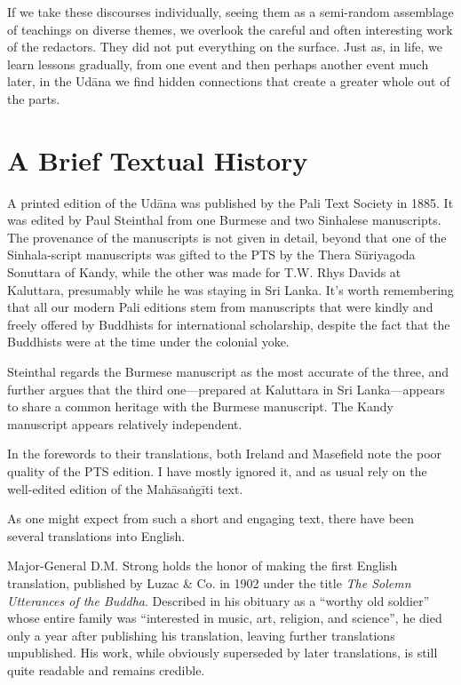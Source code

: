 \documentclass[12pt,openany]{book}%
\begin{document}
If we take these discourses individually, seeing them as a semi-random assemblage of teachings on diverse themes, we overlook the careful and often interesting work of the redactors. They did not put everything on the surface. Just as, in life, we learn lessons gradually, from one event and then perhaps another event much later, in the \textsanskrit{Udāna} we find hidden connections that create a greater whole out of the parts.

\section*{A Brief Textual History}

A printed edition of the \textsanskrit{Udāna} was published by the Pali Text Society in 1885. It was edited by Paul Steinthal from one Burmese and two Sinhalese manuscripts. The provenance of the manuscripts is not given in detail, beyond that one of the Sinhala-script manuscripts was gifted to the PTS by the Thera \textsanskrit{Sūriyagoda} Sonuttara of Kandy, while the other was made for T.W. Rhys Davids at Kaluttara, presumably while he was staying in Sri Lanka. It’s worth remembering that all our modern Pali editions stem from manuscripts that were kindly and freely offered by Buddhists for international scholarship, despite the fact that the Buddhists were at the time under the colonial yoke. 

Steinthal regards the Burmese manuscript as the most accurate of the three, and further argues that the third one—prepared at Kaluttara in Sri Lanka—appears to share a common heritage with the Burmese manuscript. The Kandy manuscript appears relatively independent.

In the forewords to their translations, both Ireland and Masefield note the poor quality of the PTS edition. I have mostly ignored it, and as usual rely on the well-edited edition of the \textsanskrit{Mahāsaṅgīti} text.

As one might expect from such a short and engaging text, there have been several translations into English. 

Major-General D.M. Strong holds the honor of making the first English translation, published by Luzac \& Co. in 1902 under the title \textit{The Solemn Utterances of the Buddha}. Described in his obituary as a “worthy old soldier” whose entire family was “interested in music, art, religion, and science”, he died only a year after publishing his translation, leaving further translations unpublished. His work, while obviously superseded by later translations, is still quite readable and remains credible.
\end{document}
